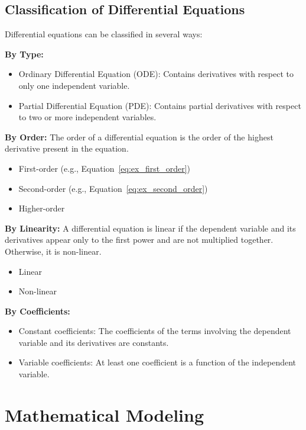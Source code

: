 \documentclass[12pt, letterpaper]{book}
\begin{document}
\subsection{Classification of Differential Equations}
\label{ssec:classification_de}
Differential equations can be classified in several ways:

\textbf{By Type:}
\begin{itemize}
    \item Ordinary Differential Equation (ODE): Contains derivatives with respect to only one independent variable.
    \item Partial Differential Equation (PDE): Contains partial derivatives with respect to two or more independent variables.
\end{itemize}

\textbf{By Order:}
The order of a differential equation is the order of the highest derivative present in the equation.
\begin{itemize}
    \item First-order (e.g., Equation~\ref{eq:ex_first_order})
    \item Second-order (e.g., Equation~\ref{eq:ex_second_order})
    \item Higher-order
\end{itemize}

\textbf{By Linearity:}
A differential equation is linear if the dependent variable and its derivatives appear only to the first power and are not multiplied together. Otherwise, it is non-linear.
\begin{itemize}
    \item Linear
    \item Non-linear
\end{itemize}

\textbf{By Coefficients:}
\begin{itemize}
    \item Constant coefficients: The coefficients of the terms involving the dependent variable and its derivatives are constants.
    \item Variable coefficients: At least one coefficient is a function of the independent variable.
\end{itemize}

\section{Mathematical Modeling}
\label{sec:math_modeling}
\end{document}

